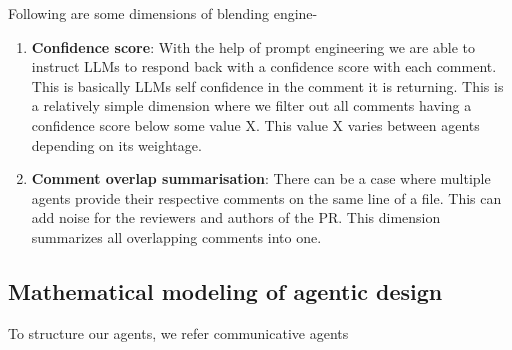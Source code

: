 Following are some dimensions of blending engine-

\begin{enumerate}
    \item \textbf{Confidence score}: With the help of prompt engineering we are able to instruct LLMs to respond back with a confidence score with each comment. This is basically LLMs self confidence in the comment it is returning. This is a relatively simple dimension where we filter out all comments having a confidence score below some value X. This value X varies between agents depending on its weightage.
    \item \textbf{Comment overlap summarisation}: There can be a case where multiple agents provide their respective comments on the same line of a file. This can add noise for the reviewers and authors of the PR. This dimension summarizes all overlapping comments into one.
\end{enumerate}

\subsection{Mathematical modeling of agentic design}
To structure our agents, we refer communicative agents \cite{qian2024chatdevcommunicativeagentssoftware}

